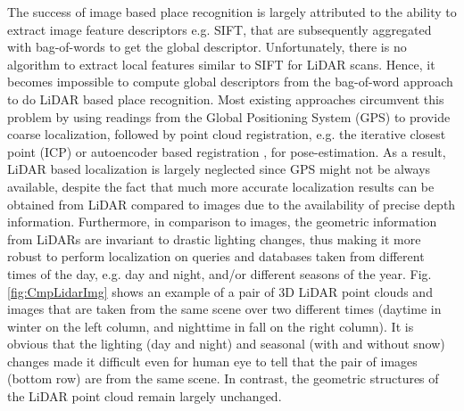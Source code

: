 \documentclass[10pt,twocolumn,letterpaper]{article}
\begin{document}
The success of image based place recognition is largely attributed to the ability to extract image feature descriptors e.g. SIFT, that are subsequently aggregated with bag-of-words to get the global descriptor.
Unfortunately, there is no algorithm to extract local features similar to SIFT for LiDAR scans.
Hence, it becomes impossible to compute global descriptors from the bag-of-word approach to do LiDAR based place recognition. Most existing approaches circumvent this problem by using readings from the Global Positioning System (GPS) to provide coarse localization, followed by point cloud registration, e.g. the iterative closest point (ICP) \cite{Segal-RSS-09} or autoencoder based registration \cite{Elbaz_2017_CVPR}, for pose-estimation. As a result, LiDAR based localization is largely neglected since GPS might not be always available, despite the fact that much more accurate localization results can be obtained from LiDAR compared to images due to the availability of precise depth information. Furthermore, in comparison to images, the geometric information from LiDARs are invariant to drastic lighting changes, thus making it more robust to perform localization on queries and databases taken from different times of the day, e.g. day and night, and/or different seasons of the year. Fig. \ref{fig:CmpLidarImg} shows an example of a pair of 3D LiDAR point clouds and images that are taken from the same scene over two different times (daytime in winter on the left column, and nighttime in fall on the right column). It is obvious that the lighting (day and night) and seasonal (with and without snow) changes made it difficult even for human eye to tell that the pair of images (bottom row) are from the same scene. In contrast, the geometric structures of the LiDAR point cloud remain largely unchanged.  
\end{document}
